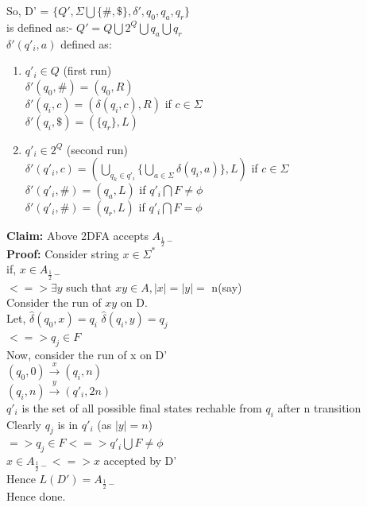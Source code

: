 \documentclass{article}
\begin{document}
So, D' = $\{Q',\Sigma \bigcup \{ \#,\$ \},\delta',q_0,q_a,q_r\}$\\ is defined as:- 
$Q' = Q \bigcup 2^Q \bigcup q_a \bigcup q_r$\\
$\delta'(q'_i,a) $ defined as:
\begin{enumerate}
    \item $q'_i \in Q$ (first run)\\
    $\delta'(q_0,\#) = (q_0,R)$\\
    $\delta'(q_i,c) = (\delta(q_i,c),R)$ if $c \in \Sigma$\\
    $\delta'(q_i,\$) = (\{q_r\},L)$\\

    \item $q'_i \in 2^Q$ (second run)\\
    $\delta'(q'_i,c) = ( \bigcup\limits_{q_k \in q'_i} \{ \bigcup\limits_{a \in \Sigma} \delta(q_i,a) \},L)$ if $c \in \Sigma$\\
    $\delta'(q'_i,\#) = (q_a,L)$ if $q'_i \bigcap F \neq \phi$\\
    $\delta'(q'_i,\#) = (q_r,L)$ if $q'_i \bigcap F = \phi$\\
\end{enumerate} 

\textbf{Claim: } Above 2DFA accepts $A_{\frac{1}{2}-}$\\
\textbf{Proof:}     
    Consider string $x \in \Sigma^*$\\
    if, $x \in A_{\frac{1}{2}-}$\\
    $<=> \exists y$ such that $ xy \in A, |x| = |y| = $ n(say)\\
    Consider the run of $xy$ on D.\\
    Let, $\hat{\delta}(q_0,x) = q_i $
    $\hat{\delta}(q_i,y) = q_j$\\
    $<=> q_j \in F$\\
    Now, consider the run of x on D' \\
    $(q_0,0) \xrightarrow{x} (q_i,n) $\\
    $(q_i,n) \xrightarrow{y} (q'_i,2n) $\\
    $q'_i$ is the set of all possible final states rechable from $q_i$ after n transition\\
    Clearly $q_j$ is in $q'_i$ (as $|y| = n$)\\
    $=> q_j \in F <=> q'_i \bigcup F \neq \phi$ \\
    $x \in A_{\frac{1}{2}-} <=> x $ accepted by D'\\
    Hence $L(D') = A_{\frac{1}{2}-}$\\
    Hence done. 
\pagebreak
\end{document}
